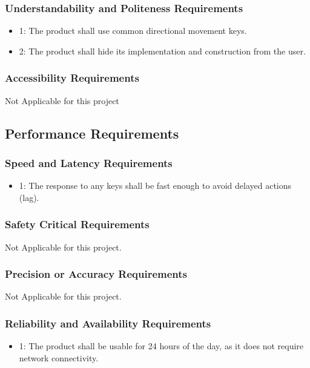 \documentclass[12pt]{article}
\begin{document}
\subsubsection*{Understandability and Politeness Requirements}
\begin{itemize}
\item 1: The product shall use common directional movement keys.
\item 2: The product shall hide its implementation and construction from the user.
\end{itemize}

\subsubsection*{Accessibility Requirements}
Not Applicable for this project

\subsection{Performance Requirements}

\subsubsection*{Speed and Latency Requirements}
\begin{itemize}
\item 1: The response to any keys shall be fast enough to avoid delayed actions (lag).
\end{itemize}

\subsubsection*{Safety Critical Requirements}
Not Applicable for this project.
\subsubsection*{Precision or Accuracy Requirements}
Not Applicable for this project.

\subsubsection*{Reliability and Availability Requirements}
\begin{itemize}
\item 1: The product shall be usable for 24 hours of the day, as it does not require network connectivity.
\end{itemize}
\end{document}

